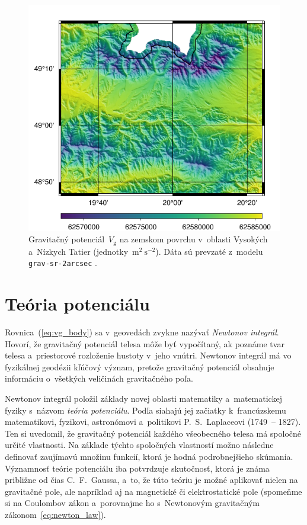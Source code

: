\documentclass[a4paper, 12pt]{book}
\newcommand{\gidx}{\mathrm g}
\begin{document}
\begin{figure}
\centering
\includegraphics{./fig-vg-grav-sr-2arcsec.pdf}
\caption{Gravitačný potenciál~$V_\gidx$ na zemskom povrchu v~oblasti Vysokých
a~Nízkych Tatier (jednotky~$\mathrm{m}^2 \ \mathrm{s}^{-2}$).  Dáta sú prevzaté
z~modelu \texttt{grav-sr-2arcsec} \parencite{GravSR2arcsec}.}
\label{fig:vg_grav_sr_2arcsec}
\end{figure}






\section{Teória potenciálu}
\label{sec:potential_theory}

Rovnica~(\ref{eq:vg_body}) sa v~geovedách zvykne nazývať \emph{Newtonov
integrál}.  Hovorí, že gravitačný potenciál telesa môže byť vypočítaný, ak 
poznáme tvar telesa a~priestorové rozloženie hustoty v~jeho vnútri.  Newtonov
integrál má vo fyzikálnej geodézii kľúčový význam, pretože gravitačný potenciál 
obsahuje informáciu o~všetkých veličinách gravitačného poľa.

Newtonov integrál položil základy novej oblasti matematiky a~matematickej 
fyziky s~názvom \emph{teória potenciálu}.  Podľa \textcite{MacMillan1930} 
siahajú jej začiatky k~francúzskemu matematikovi, fyzikovi, astronómovi 
a~politikovi P.~S.~Laplaceovi (1749~-- 1827).  Ten si uvedomil, že gravitačný 
potenciál každého všeobecného telesa má spoločné určité vlastnosti.  Na základe 
týchto spoločných vlastností možno následne definovať zaujímavú množinu 
funkcií, ktorá je hodná podrobnejšieho skúmania.  Významnosť teórie potenciálu 
iba potvrdzuje skutočnosť, ktorá je známa približne od čias C.~F.~Gaussa, a~to, 
že túto teóriu je možné aplikovať nielen na gravitačné pole, ale napríklad aj 
na magnetické či elektrostatické pole (spomeňme si na Coulombov zákon 
a~porovnajme ho s~Newtonovým gravitačným zákonom~\ref{eq:newton_law}).
\end{document}
